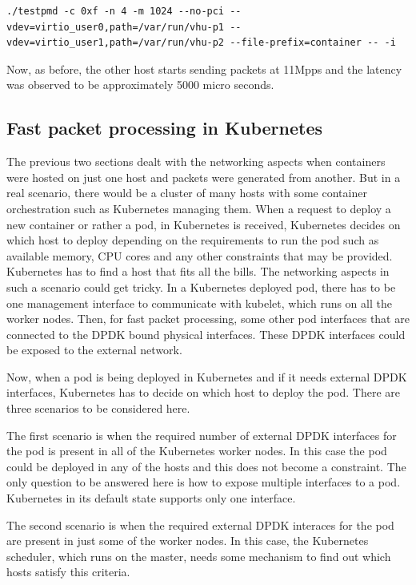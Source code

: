 \documentclass[english, 12pt, a4paper, elec, utf8, a-1b, online]{aaltothesis}
\begin{document}
\begin{lstlisting}[basicstyle={\small\ttfamily}]
./testpmd -c 0xf -n 4 -m 1024 --no-pci --vdev=virtio_user0,path=/var/run/vhu-p1 --vdev=virtio_user1,path=/var/run/vhu-p2 --file-prefix=container -- -i
\end{lstlisting}

Now, as before, the other host starts sending packets at 11Mpps and the latency was observed to be approximately 5000 micro seconds.

\subsection{Fast packet processing in Kubernetes}
The previous two sections dealt with the networking aspects when containers were hosted on just one  host and packets were generated from another. But in a real scenario, there would be a cluster of many hosts with some container orchestration such as Kubernetes managing them. When a request to deploy a new container or rather a pod, in Kubernetes is received, Kubernetes decides on which host to deploy depending on the requirements to run the pod such as available memory, CPU cores and any other constraints that may be provided. Kubernetes has to find a host that fits all the bills. The networking aspects in such a scenario could get tricky. In a Kubernetes deployed pod, there has to be one management interface to communicate with kubelet, which runs on all the worker nodes. Then, for fast packet processing, some other pod interfaces that are connected to the DPDK bound physical interfaces. These DPDK interfaces could be exposed to the external network.

Now, when a pod is being deployed in Kubernetes and if it needs external DPDK interfaces, Kubernetes has to decide on which host to deploy the pod. There are three scenarios to be considered here.

The first scenario is when the required number of external DPDK interfaces for the pod is present in all of the Kubernetes worker nodes. In this case the pod could be deployed in any of the hosts and this does not become a constraint. The only question to be answered here is how to expose multiple interfaces to a pod. Kubernetes in its default state supports only one interface.

The second scenario is when the required external DPDK interaces for the pod are present in just some of the worker nodes. In this case, the Kubernetes scheduler, which runs on the master, needs some mechanism to find out which hosts satisfy this criteria.
\end{document}
